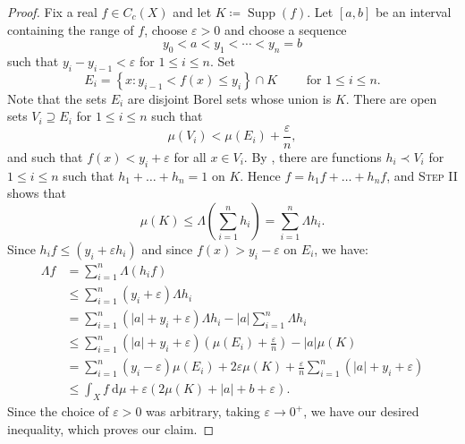\documentclass[11pt]{article}
\theoremstyle{thmstyle}
\theoremstyle{defstyle}
\newcommand{\Supp}{\operatorname{Supp}}
\renewcommand{\le}{\leqslant}
\begin{document}
\begin{proof}
    Fix a real $f\in C_c(X)$ and let $K\coloneq\Supp(f)$. Let $[a, b]$ be an interval containing the range of $f$, choose $\varepsilon > 0$ and choose a sequence 
    \begin{equation*}
        y_0 < a < y_1 < \cdots < y_n = b
    \end{equation*}
    such that $y_i - y_{i - 1} < \varepsilon$ for $1\le i\le n$. Set 
    \begin{equation*}
        E_i = \left\{x\colon y_{i - 1} < f(x) \le y_i\right\}\cap K\qquad\text{ for }1\le i\le n.
    \end{equation*}
    Note that the sets $E_i$ are disjoint Borel sets whose union is $K$. There are open sets $V_i\supseteq E_i$ for $1\le i\le n$ such that 
    \begin{equation*}
        \mu(V_i) < \mu(E_i) + \frac{\varepsilon}{n},
    \end{equation*}
    and such that $f(x) < y_i + \varepsilon$ for all $x\in V_i$. By , there are functions $h_i\prec V_i$ for $1\le i\le n$ such that $h_1 + \dots + h_n = 1$ on $K$. Hence $f = h_1f + \dots + h_n f$, and \textsc{Step II} shows that 
    \begin{equation*}
        \mu(K) \le\Lambda\left(\sum_{i = 1}^n h_i\right) = \sum_{i = 1}^n\Lambda h_i.
    \end{equation*}
    Since $h_if\le (y_i + \varepsilon h_i)$ and since $f(x) > y_i - \varepsilon$ on $E_i$, we have: 
    \begin{align*}
        \Lambda f &= \sum_{i = 1}^n\Lambda(h_i f)\\
        &\le\sum_{i = 1}^n (y_i + \varepsilon)\Lambda h_i\\
        &= \sum_{i = 1}^n (|a| + y_i + \varepsilon)\Lambda h_i - |a|\sum_{i = 1}^n \Lambda h_i\\
        &\le\sum_{i =1}^n (|a| + y_i + \varepsilon)\left(\mu(E_i) + \frac{\varepsilon}{n}\right) - |a|\mu(K)\\
        &= \sum_{i = 1}^n (y_i - \varepsilon)\mu(E_i) + 2\varepsilon\mu(K) + \frac{\varepsilon}{n}\sum_{i = 1}^n(|a| + y_i + \varepsilon)\\
        &\le \int_X f~\mathrm d\mu + \varepsilon\left(2\mu(K) + |a| + b + \varepsilon\right).
    \end{align*}
    Since the choice of $\varepsilon > 0$ was arbitrary, taking $\varepsilon\to 0^+$, we have our desired inequality, which proves our claim.
\end{proof}
\end{document}
